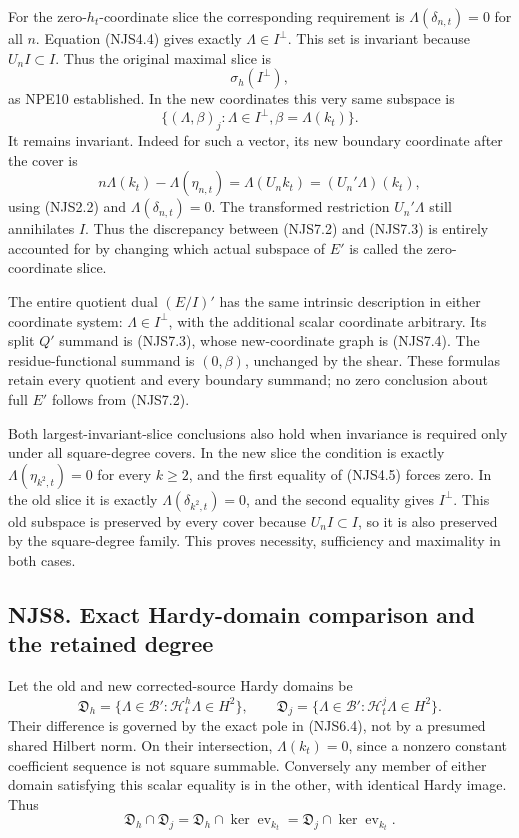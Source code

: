 For the zero-\(h_t\)-coordinate slice the corresponding requirement is
\(\Lambda(\delta_{n,t})=0\) for all \(n\). Equation (NJS4.4) gives
exactly \(\Lambda\in I^\perp\). This set is invariant because
\(U_nI\subset I\). Thus the original maximal slice is \[
\boxed{\sigma_h(I^\perp),}
\tag{NJS7.3}
\] as NPE10 established. In the new coordinates this very same subspace
is \[
\boxed{\{(\Lambda,\beta)_j:\Lambda\in I^\perp, \beta=\Lambda(k_t)\}.}
\tag{NJS7.4}
\] It remains invariant. Indeed for such a vector, its new boundary
coordinate after the cover is \[
n\Lambda(k_t)-\Lambda(\eta_{n,t})
=\Lambda(U_nk_t)=(U_n'\Lambda)(k_t),
\] using (NJS2.2) and \(\Lambda(\delta_{n,t})=0\). The transformed
restriction \(U_n'\Lambda\) still annihilates \(I\). Thus the
discrepancy between (NJS7.2) and (NJS7.3) is entirely accounted for by
changing which actual subspace of \(E'\) is called the zero-coordinate
slice.

The entire quotient dual \((E/I)'\) has the same intrinsic description
in either coordinate system: \(\Lambda\in I^\perp\), with the additional
scalar coordinate arbitrary. Its split \(Q'\) summand is (NJS7.3), whose
new-coordinate graph is (NJS7.4). The residue-functional summand is
\((0,\beta)\), unchanged by the shear. These formulas retain every
quotient and every boundary summand; no zero conclusion about full
\(E'\) follows from (NJS7.2).

Both largest-invariant-slice conclusions also hold when invariance is
required only under all square-degree covers. In the new slice the
condition is exactly \(\Lambda(\eta_{k^2,t})=0\) for every \(k\ge2\),
and the first equality of (NJS4.5) forces zero. In the old slice it is
exactly \(\Lambda(\delta_{k^2,t})=0\), and the second equality gives
\(I^\perp\). This old subspace is preserved by every cover because
\(U_nI\subset I\), so it is also preserved by the square-degree family.
This proves necessity, sufficiency and maximality in both cases.

\subsection{NJS8. Exact Hardy-domain comparison and the retained
degree}\label{njs8.-exact-hardy-domain-comparison-and-the-retained-degree}

Let the old and new corrected-source Hardy domains be \[
\mathfrak D_h=\{\Lambda\in\mathcal B':\mathcal H_t^h\Lambda\in H^2\},
\qquad
\mathfrak D_j=\{\Lambda\in\mathcal B':\mathcal H_t^j\Lambda\in H^2\}.
\tag{NJS8.1}
\] Their difference is governed by the exact pole in (NJS6.4), not by a
presumed shared Hilbert norm. On their intersection, \(\Lambda(k_t)=0\),
since a nonzero constant coefficient sequence is not square summable.
Conversely any member of either domain satisfying this scalar equality
is in the other, with identical Hardy image. Thus \[
\mathfrak D_h\cap\mathfrak D_j
=\mathfrak D_h\cap\ker\operatorname{ev}_{k_t}
=\mathfrak D_j\cap\ker\operatorname{ev}_{k_t}.
\tag{NJS8.2}
\]

